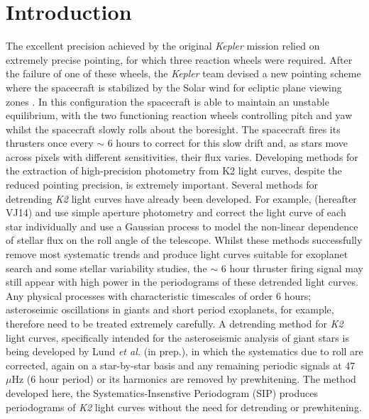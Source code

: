 \documentclass[useAMS, usenatbib, preprint, 12pt]{aastex}
\begin{document}
\section{Introduction}
\label{Introduction}

The excellent precision achieved by the original {\it Kepler} mission relied
on extremely precise pointing, for which three reaction wheels were required.
After the failure of one of these wheels, the {\it Kepler} team devised a new
pointing scheme where the spacecraft is stabilized by the Solar wind for
ecliptic plane viewing zones \citep{Howell2014}.
In this configuration the spacecraft is able to maintain an unstable
equilibrium, with the two functioning reaction wheels controlling pitch and
yaw whilst the spacecraft slowly rolls about the boresight.
The spacecraft fires its thrusters once every $\sim$ 6 hours
\citep{Vanderburg2014} to correct for
this slow drift and, as stars move across pixels with different sensitivities,
their flux varies.
Developing methods for the extraction of high-precision photometry from K2
light curves, despite the reduced pointing precision, is extremely
important.
Several methods for detrending {\it K2} light curves have already been
developed.
For example, \citet{Vanderburg2014} (hereafter VJ14) and \citet{Crossfield2015}
use simple aperture photometry and correct the light curve of each star
individually and \citet{Aigrain2015} use a Gaussian process to model the
non-linear dependence of stellar flux on the roll angle of the telescope.
Whilst these methods successfully remove most systematic trends and
produce light curves suitable for exoplanet search and some stellar
variability studies, the $\sim$ 6 hour thruster firing signal may still appear
with high power in the periodograms of these detrended light curves.
Any physical processes with characteristic timescales of order
6 hours; asteroseimic oscillations in giants and short period
exoplanets, for example, therefore need to be treated extremely carefully.
A detrending method for {\it K2} light curves, specifically intended for the
asteroseismic analysis of giant stars is being developed by Lund {\it et al.}
(in prep.), in which the systematics due to roll are corrected, again on
a star-by-star basis and any remaining periodic signals at 47 $\mu$Hz (6 hour
period) or its harmonics are removed by prewhitening.
The method developed here, the Systematics-Insenstive Periodogram (SIP)
produces periodograms of {\it K2} light curves without the need for detrending
or prewhitening.
\end{document}
